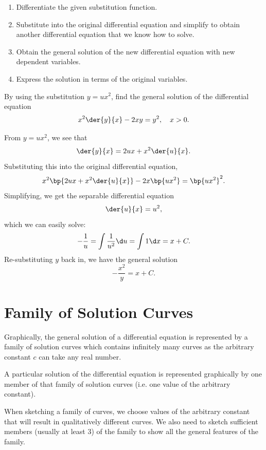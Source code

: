 \begin{recipe}
    \phantom{.}
    \begin{enumerate}
        \item Differentiate the given substitution function.
        \item Substitute into the original differential equation and simplify to obtain another differential equation that we know how to solve.
        \item Obtain the general solution of the new differential equation with new dependent variables.
        \item Express the solution in terms of the original variables.
    \end{enumerate}
\end{recipe}

\begin{sample}
    By using the substitution $y = ux^2$, find the general solution of the differential equation \[x^2 \der{y}{x} - 2xy = y^2, \quad x > 0.\]
\end{sample}
\begin{sampans}
    From $y = ux^2$, we see that \[\der{y}{x} = 2ux + x^2 \der{u}{x}.\] Substituting this into the original differential equation, \[x^2 \bp{2ux + x^2 \der{u}{x}} - 2x \bp{ux^2} = \bp{ux^2}^2.\] Simplifying, we get the separable differential equation \[\der{u}{x} = u^2,\] which we can easily solve: \[-\frac1u = \int \frac1{u^2} \d u = \int 1 \d x = x + C.\] Re-substituting $y$ back in, we have the general solution \[-\frac{x^2}{y} = x + C.\]
\end{sampans}

\section{Family of Solution Curves}

Graphically, the general solution of a differential equation is represented by a family of solution curves which contains infinitely many curves as the arbitrary constant $c$ can take any real number.

A particular solution of the differential equation is represented graphically by one member of that family of solution curves (i.e. one value of the arbitrary constant).

When sketching a family of curves, we choose values of the arbitrary constant that will result in qualitatively different curves. We also need to sketch sufficient members (usually at least 3) of the family to show all the general features of the family.

